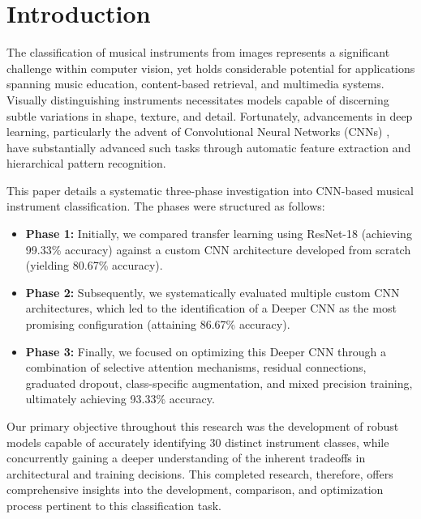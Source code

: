 
\section{Introduction}
The classification of musical instruments from images represents a significant challenge within computer vision, yet holds considerable potential for applications spanning music education, content-based retrieval, and multimedia systems. Visually distinguishing instruments necessitates models capable of discerning subtle variations in shape, texture, and detail. Fortunately, advancements in deep learning, particularly the advent of Convolutional Neural Networks (CNNs) \cite{krizhevsky2012imagenet, simonyan2014very}, have substantially advanced such tasks through automatic feature extraction and hierarchical pattern recognition.

This paper details a systematic three-phase investigation into CNN-based musical instrument classification. The phases were structured as follows:
\begin{itemize}
    \item \textbf{Phase 1:} Initially, we compared transfer learning using ResNet-18 (achieving 99.33\% accuracy) against a custom CNN architecture developed from scratch (yielding 80.67\% accuracy).
    \item \textbf{Phase 2:} Subsequently, we systematically evaluated multiple custom CNN architectures, which led to the identification of a Deeper CNN as the most promising configuration (attaining 86.67\% accuracy).
    \item \textbf{Phase 3:} Finally, we focused on optimizing this Deeper CNN through a combination of selective attention mechanisms, residual connections, graduated dropout, class-specific augmentation, and mixed precision training, ultimately achieving 93.33\% accuracy.
\end{itemize}

Our primary objective throughout this research was the development of robust models capable of accurately identifying 30 distinct instrument classes, while concurrently gaining a deeper understanding of the inherent tradeoffs in architectural and training decisions. This completed research, therefore, offers comprehensive insights into the development, comparison, and optimization process pertinent to this classification task.

